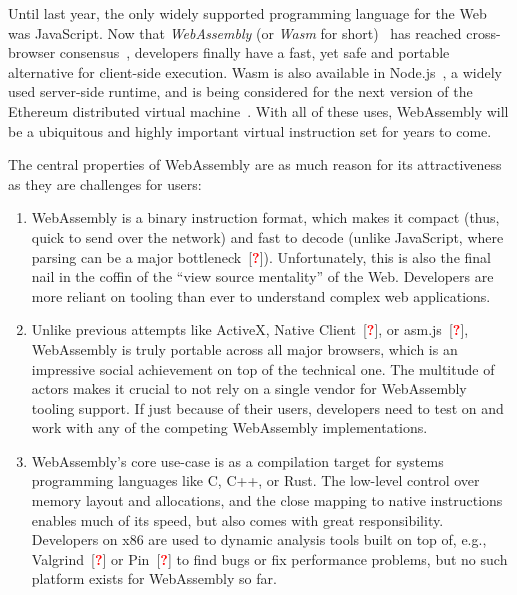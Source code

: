 \documentclass[sigplan,review,anonymous]{acmart}\settopmatter{printfolios=true,printccs=false,printacmref=false}
\newcommand{\citeTodo}{[\textcolor{red}{\bfseries?}]}
\begin{document}

Until last year, the only widely supported programming language for the Web was JavaScript. Now that \emph{WebAssembly} (or \emph{Wasm} for short)~\cite{Haas:2017:BWU:3062341.3062363, WasmWebsite} has reached cross-browser consensus~\cite{WasmConsensus}, developers finally have a fast, yet safe and portable alternative for client-side execution. Wasm is also available in Node.js~\cite{NodejsWebsite}, a widely used server-side runtime, and is being considered for the next version of the Ethereum distributed virtual machine~\cite{EthereumWasm}. With all of these uses, WebAssembly will be a ubiquitous and highly important virtual instruction set for years to come.

The central properties of WebAssembly are as much reason for its attractiveness as they are challenges for users: 
\begin{enumerate}[leftmargin=\parindent]
	\item WebAssembly is a binary instruction format, which makes it compact (thus, quick to send over the network) and fast to decode (unlike JavaScript, where parsing can be a major bottleneck~\citeTodo). Unfortunately, this is also the final nail in the coffin of the \enquote{view source mentality} of the Web. Developers are more reliant on tooling than ever to understand complex web applications.
	
	\item Unlike previous attempts like ActiveX, Native Client~\citeTodo, or asm.js~\citeTodo, WebAssembly is truly portable across all major browsers, which is an impressive social achievement on top of the technical one. The multitude of actors makes it crucial to not rely on a single vendor for WebAssembly tooling support. If just because of their users, developers need to test on and work with any of the competing WebAssembly implementations.
	 
	\item WebAssembly's core use-case is as a compilation target for systems programming languages like C, C++, or Rust. The low-level control over memory layout and allocations, and the close mapping to native instructions enables much of its speed, but also comes with great responsibility. Developers on x86 are used to dynamic analysis tools built on top of, e.g., Valgrind~\citeTodo{} or Pin~\citeTodo{} to find bugs or fix performance problems, but no such platform exists for WebAssembly so far.
\end{enumerate}
\end{document}
